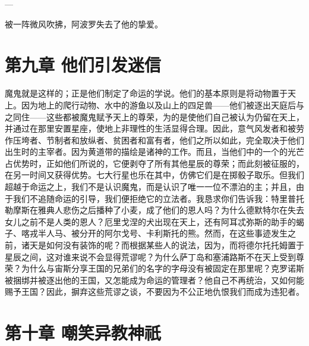  —\par

被一阵微风吹拂，阿波罗失去了他的挚爱。\par


\section{第九章 他们引发迷信}

魔鬼就是这样的；正是他们制定了命运的学说。他们的基本原则是将动物置于天上。因为地上的爬行动物、水中的游鱼以及山上的四足兽——他们被逐出天庭后与之同住——这些都被魔鬼赋予天上的尊荣，为的是使他们自己被认为仍留在天上，并通过在那里安置星座，使地上非理性的生活显得合理。因此，意气风发者和被劳作压垮者、节制者和放纵者、贫困者和富有者，他们之所以如此，完全取决于他们出生时的主宰者。因为黄道带的描绘是诸神的工作。而且，当他们中的一个的光芒占优势时，正如他们所说的，它便剥夺了所有其他星辰的尊荣；而此刻被征服的，在另一时间又获得优势。七大行星也乐在其中，仿佛它们是在掷骰子取乐。但我们超越于命运之上，我们不是认识魔鬼，而是认识了唯一一位不漂泊的主；并且，由于我们不追随命运的引导，我们便拒绝它的立法者。我恳求你们告诉我：特里普托勒摩斯在雅典人悲伤之后播种了小麦，成了他们的恩人吗？为什么德默特尔在失去女儿之前不是人类的恩人？厄里戈涅的犬出现在天上，还有阿耳忒弥斯的助手的蝎子、喀戎半人马、被分开的阿尔戈号、卡利斯托的熊。然而，在这些事迹发生之前，诸天是如何没有装饰的呢？而根据某些人的说法，因为，而将德尔托托姆置于星辰之间，这对谁来说不会显得荒谬呢？为什么萨丁岛和塞浦路斯不在天上受到尊荣？为什么与宙斯分享王国的兄弟们的名字的字母没有被固定在那里呢？克罗诺斯被捆绑并被逐出他的王国，又怎能成为命运的管理者？他自己不再统治，又如何能赐予王国？因此，摒弃这些荒谬之谈，不要因为不公正地仇恨我们而成为违犯者。\par


\section{第十章 嘲笑异教神祇}

